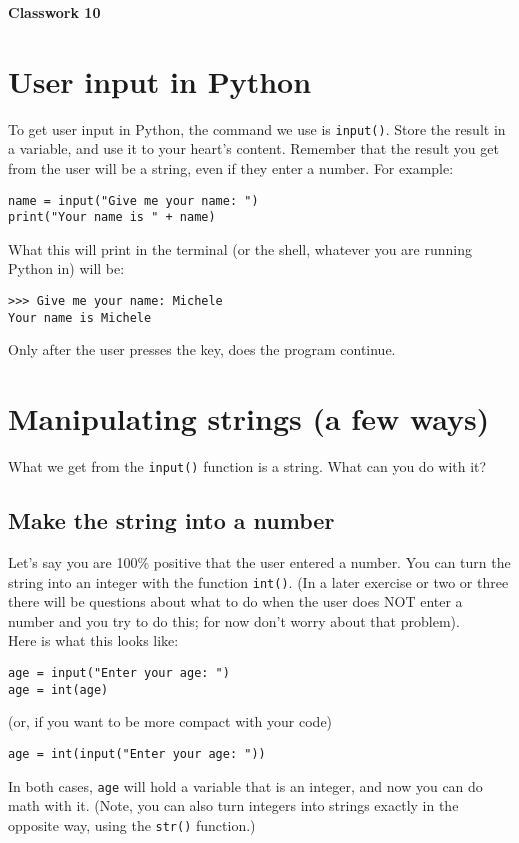 \documentclass[a4paper]{article}
\begin{document}
\textbf{\Huge Classwork 10} 
\section{User input in Python}
To get user input in Python, the command we use is \texttt{input()}.
Store the result in a variable, and use it to your heart's content.
Remember that the result you get from the user will be a string, even if they enter a number.
For example:
\begin{verbatim}
name = input("Give me your name: ") 
print("Your name is " + name)
\end{verbatim}
What this will print in the terminal (or the shell, whatever you are running Python in) will be:
\begin{verbatim}
>>> Give me your name: Michele
Your name is Michele
\end{verbatim}
Only after the user presses the \keys{\return{}} key, does the program continue.
\section{Manipulating strings (a few ways)}
What we get from the \texttt{input()} function is a string.
What can you do with it?
\subsection{Make the string into a number}
Let's say you are 100\% positive that the user entered a number.
You can turn the string into an integer with the function \texttt{int()}.
(In a later exercise or two or three there will be questions about what to do when the user does NOT enter a number and you try to do this; for now don't worry about that problem). \\
Here is what this looks like:
\begin{verbatim}
age = input("Enter your age: ") 
age = int(age)
\end{verbatim}
(or, if you want to be more compact with your code)
\begin{verbatim}
age = int(input("Enter your age: "))
\end{verbatim}
In both cases, \texttt{age} will hold a variable that is an integer, and now you can do math with it.
(Note, you can also turn integers into strings exactly in the opposite way, using the \texttt{str()} function.)
\clearpage
\end{document}
